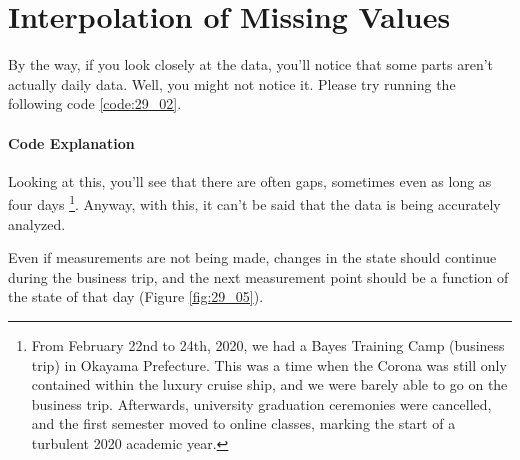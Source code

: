\documentclass{ltjsbook}
\begin{document}



\section{Interpolation of Missing Values}
By the way, if you look closely at the data, you'll notice that some parts aren't actually daily data. Well, you might not notice it. Please try running the following code \ref{code:29_02}.

\paragraph{Code Explanation}

Looking at this, you'll see that there are often gaps, sometimes even as long as four days \footnote{From February 22nd to 24th, 2020, we had a Bayes Training Camp (business trip) in Okayama Prefecture. This was a time when the Corona was still only contained within the luxury cruise ship, and we were barely able to go on the business trip. Afterwards, university graduation ceremonies were cancelled, and the first semester moved to online classes, marking the start of a turbulent 2020 academic year.}. Anyway, with this, it can't be said that the data is being accurately analyzed.

Even if measurements are not being made, changes in the state should continue during the business trip, and the next measurement point should be a function of the state of that day (Figure \ref{fig:29_05}).

\end{document}
